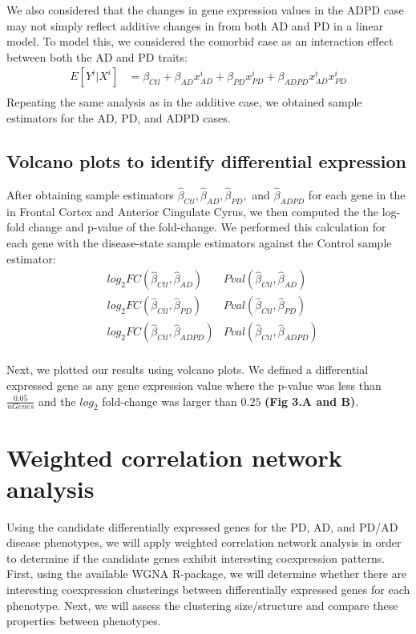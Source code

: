 We also considered that the changes in gene expression values in the ADPD case may not simply reflect additive changes in from both AD and PD in a linear model. To model this, we considered the comorbid case as an interaction effect between both the AD and PD traits:
\begin{align*}
E[Y^{i}|X^{i}] &= \beta_{Ctl} + \beta_{AD}x_{AD}^{i} + \beta_{PD}x_{PD}^{i} + \beta_{ADPD}x_{AD}^{i}x_{PD}^{i} \\  
\end{align*}
Repeating the same analysis as in the additive case, we obtained sample estimators for the AD, PD, and ADPD cases.

\subsection{Volcano plots to identify differential expression}
\label{subsec:volc-plots-ident}

After obtaining sample estimators  $\hat{\beta}_{Ctl}, \hat{\beta}_{AD}, \hat{\beta}_{PD},$ and $\hat{\beta}_{ADPD}$ for each gene in the in Frontal Cortex and Anterior Cingulate Cyrus, we then computed the the log-fold change and p-value of the fold-change. We performed this calculation for each gene with the disease-state sample estimators against the Control sample estimator:
\begin{align*}
& log_{2}FC( \hat{\beta}_{Ctl},\hat{\beta}_{AD})		&Pval (\hat{ \beta}_{Ctl},\hat{\beta}_{AD}) \\  
& log_{2}FC(\hat{ \beta}_{Ctl},\hat{\beta}_{PD})		& Pval(\hat{ \beta}_{Ctl},\hat{\beta}_{PD}) \\  
& log_{2}FC( \hat{\beta}_{Ctl},\hat{\beta}_{ADPD})   		& Pval(\hat{ \beta}_{Ctl},\hat{\beta}_{ADPD}) \\  
\end{align*}

Next, we plotted our results using volcano plots. We defined a differential expressed gene as any gene expression value where the p-value was less than $\frac{0.05}{nGenes}$ and the $log_{2}$ fold-change was larger than $0.25$ \textbf{(Fig 3.A and B)}.

\section{Weighted correlation network analysis}
\label{sec:weight-corr-netw}

 Using the candidate differentially expressed genes for the PD, AD, and PD/AD disease phenotypes, we will apply weighted correlation network analysis in order to determine if the candidate genes exhibit interesting coexpression patterns. First, using the available WGNA R-package\cite{Langfelder2008}, we will determine whether there are interesting coexpression clusterings between differentially expressed genes for each phenotype. Next, we will assess the clustering size/structure and compare these properties between phenotypes.


